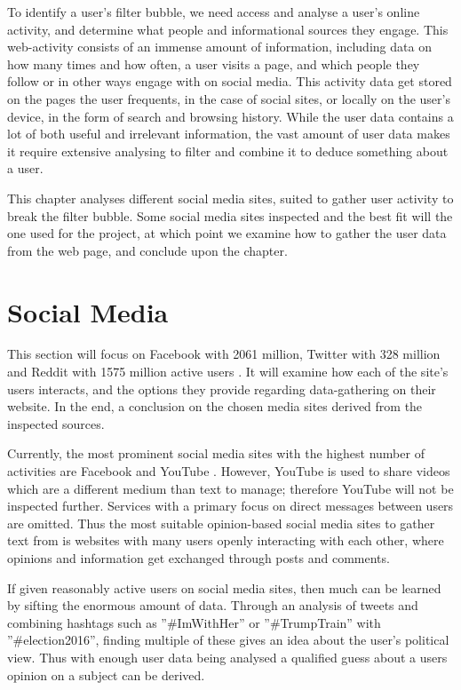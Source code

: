 
To identify a user's filter bubble, we need access and analyse a user's online
activity, and determine what people and informational sources they engage. This
web-activity consists of an immense amount of information, including data on how
many times and how often, a user visits a page, and which people they follow or
in other ways engage with on social media. This activity data get stored on the
pages the user frequents, in the case of social sites, or locally on the user's
device, in the form of search and browsing history. While the user data contains
a lot of both useful and irrelevant information, the vast amount of user data
makes it require extensive analysing to filter and combine it to deduce
something about a user.\nl

This chapter analyses different social media sites, suited to gather user
activity to break the filter bubble. Some social media sites inspected and the
best fit will the one used for the project, at which point we examine how to
gather the user data from the web page, and conclude upon the chapter.


\section{Social Media}
This section will focus on Facebook with 2061 million, Twitter with 328 million
and Reddit with 1575 million active users \citep{SocialMediaStats,
AdvertiseOnReddit}. It will examine how each of the site's users interacts, and
the options they provide regarding data-gathering on their website. In the end,
a conclusion on the chosen media sites derived from the inspected sources.

Currently, the most prominent social media sites with the highest number of
activities are Facebook and YouTube \citep{SocialMediaStats}. However, YouTube
is used to share videos which are a different medium than text to manage;
therefore YouTube will not be inspected further. Services with a primary focus
on direct messages between users are omitted. Thus the most suitable
opinion-based social media sites to gather text from is websites with many users
openly interacting with each other, where opinions and information get exchanged
through posts and comments.\nl

If given reasonably active users on social media sites, then much can be learned
by sifting the enormous amount of data. Through an analysis of tweets and
combining hashtags such as ”\#ImWithHer” or ”\#TrumpTrain” with
”\#election2016”, finding multiple of these gives an idea about the user's
political view. Thus with enough user data being analysed a qualified guess
about a users opinion on a subject can be derived.\nl
